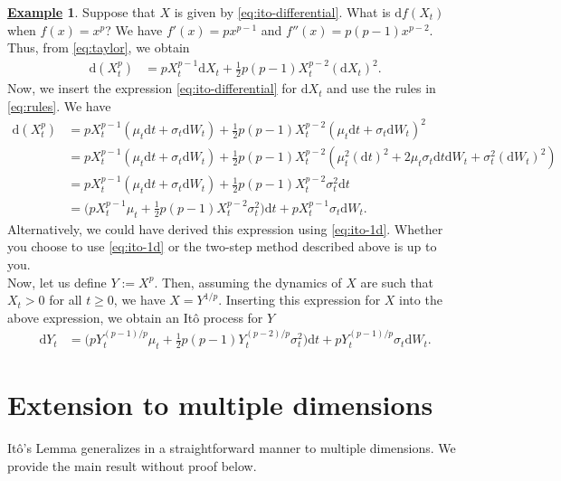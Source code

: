 \documentclass[12pt]{book}
\numberwithin{equation}{chapter}
\theoremstyle{plain}
\numberwithin{theorem}{section}
\theoremstyle{definition}
\newtheorem{example}[theorem]{\underline{Example}}
\numberwithin{exercise}{chapter}
\newcommand{\<}{\langle}
\renewcommand{\>}{\rangle}
\renewcommand{\(}{\left(}
\renewcommand{\)}{\right)}
\renewcommand{\[}{\left[}
\renewcommand{\]}{\right]}
\newcommand\sig{\sigma}
\newcommand\dd{\mathrm{d}}
\theoremstyle{definition}
\numberwithin{question}{section}
\begin{document}
\begin{example}
Suppose that $X$ is given by \eqref{eq:ito-differential}.  What is $\dd f(X_t)$ when $f(x) = x^p$?  We have $f'(x) = p x^{p-1}$ and $f''(x) = p (p-1) x^{p-2}$.  Thus, from \eqref{eq:taylor}, we obtain
\begin{align}
\dd (X_t^p) 
	&= p X_t^{p-1} \dd X_t + \frac{1}{2} p (p-1) X_t^{p-2} (\dd X_t)^2 .
\end{align}
Now, we insert the expression \eqref{eq:ito-differential} for $\dd X_t$ and use the rules in \eqref{eq:rules}.  We have
\begin{align}
\dd (X_t^p) 
	&= p X_t^{p-1} ( \mu_t \dd t + \sig_t \dd W_t ) + \frac{1}{2} p (p-1) X_t^{p-2} ( \mu_t \dd t + \sig_t \dd W_t )^2 \\
	&= p X_t^{p-1} ( \mu_t \dd t + \sig_t \dd W_t ) + \frac{1}{2} p (p-1) X_t^{p-2} ( \mu_t^2 (\dd t)^2 + 2 \mu_t \sig_t \dd t \dd W_t + \sig_t^2 (\dd W_t)^2 ) \\
	&= p X_t^{p-1} ( \mu_t \dd t + \sig_t \dd W_t ) + \frac{1}{2} p (p-1) X_t^{p-2} \sig_t^2 \dd t \\
	&= \Big( p X_t^{p-1} \mu_t + \frac{1}{2} p (p-1) X_t^{p-2} \sig_t^2 \Big) \dd t + p X_t^{p-1} \sig_t \dd W_t .
\end{align}
Alternatively, we could have derived this expression using \eqref{eq:ito-1d}.  Whether you choose to use \eqref{eq:ito-1d} or the two-step method described above is up to you.
\\[0.5em]
Now, let us define $Y := X^p$.  Then, assuming the dynamics of $X$ are such that $X_t > 0$ for all $t \geq 0$, we have $X = Y^{1/p}$.  Inserting this expression for $X$ into the above expression, we obtain an It\^o process for $Y$
\begin{align}
\dd Y_t 
	&= \Big( p Y_t^{(p-1)/p} \mu_t + \frac{1}{2} p (p-1) Y_t^{(p-2)/p} \sig_t^2 \Big) \dd t + p Y_t^{(p-1)/p} \sig_t \dd W_t .
\end{align}
\end{example}

\section{Extension to multiple dimensions}

It\^o's Lemma generalizes in a straightforward manner to multiple dimensions.  We provide the main result without proof below.
\end{document}
